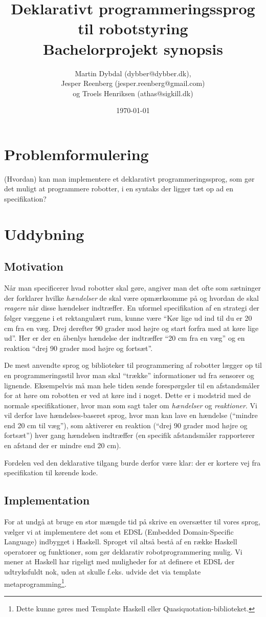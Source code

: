 \documentclass[a4paper,oneside, final]{memoir}
\title{Deklarativt programmeringssprog til robotstyring \\ \small{Bachelorprojekt synopsis}}
\author{Martin Dybdal (dybber@dybber.dk), \\
Jesper Reenberg (jesper.reenberg@gmail.com) \\ og
Troels Henriksen (athas@sigkill.dk)}
\date{\today}
\begin{document}
\maketitle



\section{Problemformulering}
(Hvordan) kan man implementere et deklarativt programmeringssprog, som gør det
muligt at programmere robotter, i en syntaks der ligger tæt op ad en
specifikation?

\section{Uddybning}
\subsection{Motivation}
Når man specificerer hvad robotter skal gøre, angiver man det ofte som
sætninger der forklarer hvilke \textit{hændelser} de skal være opmærksomme på og
hvordan de skal \textit{reagere} når disse hændelser indtræffer. En uformel
specifikation af en strategi der følger væggene i et rektangulært
rum, kunne være ``Kør lige
ud ind til du er 20 cm fra en væg. Drej derefter 90 grader mod højre
og start forfra med at køre lige ud''. Her er der en åbenlys hændelse
der indtræffer ``20 cm fra en væg'' og en reaktion ``drej 90 grader
mod højre og fortsæt''.

De mest anvendte sprog og biblioteker til programmering af robotter
lægger op til en programmeringsstil hvor man skal ``trække''
informationer ud fra sensorer og lignende. Eksempelvis må man hele
tiden sende forespørgsler til en afstandsmåler for at høre om robotten
er ved at køre ind i noget. Dette er i modstrid med de normale
specifikationer, hvor man som sagt taler om \textit{hændelser} og
\textit{reaktioner}. Vi vil derfor lave hændelses-baseret sprog, hvor
man kan lave en hændelse (``mindre end 20 cm til væg''), som
aktiverer en reaktion (``drej 90 grader mod højre og fortsæt'') hver
gang hændelsen indtræffer (en specifik afstandsmåler rapporterer en
afstand der er mindre end 20 cm).

Fordelen ved den deklarative tilgang burde derfor være klar: der er
kortere vej fra specifikation til kørende kode.


\subsection{Implementation}
For at undgå at bruge en stor mængde tid på skrive en oversætter til
vores sprog, vælger vi at implementere det som et
EDSL (Embedded Domain-Specific Language) indbygget i
Haskell. Sproget vil altså bestå af en række Haskell operatorer og
funktioner, som gør deklarativ robotprogrammering mulig. Vi mener at
Haskell har rigeligt med muligheder for at definere et EDSL der
udtryksfuldt nok, uden at skulle f.eks. udvide det via template
metaprogramming\footnote{Dette kunne gøres med Template Haskell
  eller Quasiquotation-biblioteket.}.
\end{document}
